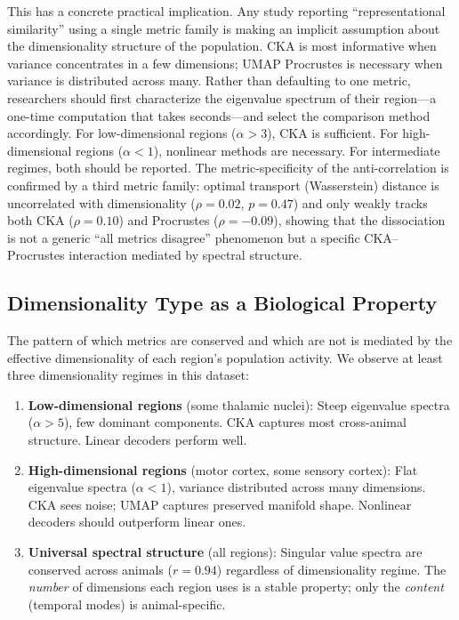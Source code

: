 \documentclass{article}
\begin{document}
This has a concrete practical implication. Any study reporting ``representational similarity'' using a single metric family is making an implicit assumption about the dimensionality structure of the population. CKA is most informative when variance concentrates in a few dimensions; UMAP Procrustes is necessary when variance is distributed across many. Rather than defaulting to one metric, researchers should first characterize the eigenvalue spectrum of their region---a one-time computation that takes seconds---and select the comparison method accordingly. For low-dimensional regions ($\alpha > 3$), CKA is sufficient. For high-dimensional regions ($\alpha < 1$), nonlinear methods are necessary. For intermediate regimes, both should be reported. The metric-specificity of the anti-correlation is confirmed by a third metric family: optimal transport (Wasserstein) distance is uncorrelated with dimensionality ($\rho = 0.02$, $p = 0.47$) and only weakly tracks both CKA ($\rho = 0.10$) and Procrustes ($\rho = -0.09$), showing that the dissociation is not a generic ``all metrics disagree'' phenomenon but a specific CKA--Procrustes interaction mediated by spectral structure.

\subsection{Dimensionality Type as a Biological Property}

The pattern of which metrics are conserved and which are not is mediated by the effective dimensionality of each region's population activity. We observe at least three dimensionality regimes in this dataset:

\begin{enumerate}
\item \textbf{Low-dimensional regions} (some thalamic nuclei): Steep eigenvalue spectra ($\alpha > 5$), few dominant components. CKA captures most cross-animal structure. Linear decoders perform well.
\item \textbf{High-dimensional regions} (motor cortex, some sensory cortex): Flat eigenvalue spectra ($\alpha < 1$), variance distributed across many dimensions. CKA sees noise; UMAP captures preserved manifold shape. Nonlinear decoders should outperform linear ones.
\item \textbf{Universal spectral structure} (all regions): Singular value spectra are conserved across animals ($r = 0.94$) regardless of dimensionality regime. The \emph{number} of dimensions each region uses is a stable property; only the \emph{content} (temporal modes) is animal-specific.
\end{enumerate}
\end{document}
